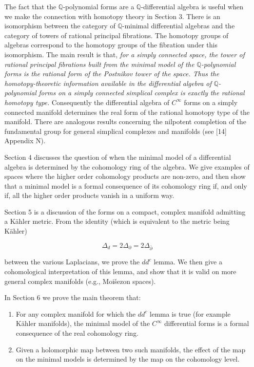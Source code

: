 \documentclass[
  english,
  a3paper,
  a3paper]{extarticle}
\begin{document}
The fact that the \(\mathbb Q\)-polynomial forms are a
\(\mathbb Q\)-differential algebra is useful when we make the connection
with homotopy theory in Section 3. There is an isomorphism between the
category of \(\mathbb Q\)-minimal differential algebras and the category
of towers of rational principal fibrations. The homotopy groups of
algebras correspond to the homotopy groups of the fibration under this
isomorphism. The main result is that, \emph{for a simply connected
space, the tower of rational principal fibrations built from the minimal
model of the \(\mathbb Q\)-polynomial forms is the rational form of the
Postnikov tower of the space. Thus the homotopy-theoretic information
available in the differential algebra of \(\mathbb Q\)-polynomial forms
on a simply connected simplical complex is exactly the rational homotopy
type.} Consequently the differential algebra of \(C^\infty\) forms on a
simply connected manifold determines the real form of the rational
homotopy type of the manifold. There are analogous results concerning
the nilpotent completion of the fundamental group for general simplical
complexes and manifolds (see {[}14{]} Appendix N).

Section 4 discusses the question of when the minimal model of a
differential algebra is determined by the cohomology ring of the
algebra. We give examples of spaces where the higher order cohomology
products are non-zero, and then show that a minimal model is a formal
consequence of its cohomology ring if, and only if, all the higher order
products vanish in a uniform way.

Section 5 is a discussion of the forms on a compact, complex manifold
admitting a Kähler metric. From the identity (which is equivalent to the
metric being Kähler)

\[
\Delta_d=2\Delta_{\partial}=2\Delta_{\bar\partial}
\]

between the various Laplacians, we prove the \(dd^c\) lemma. We then
give a cohomological interpretation of this lemma, and show that it is
valid on more general complex manifolds (e.g., Moišezon spaces).

In Section 6 we prove the main theorem that:

\begin{enumerate}
\def\labelenumi{\arabic{enumi})}
\item
  For any complex manifold for which the \(dd^c\) lemma is true (for
  example Kähler manifolds), the minimal model of the \(C^\infty\)
  differential forms is a formal consequence of the real cohomology
  ring.
\item
  Given a holomorphic map between two such manifolds, the effect of the
  map on the minimal models is determined by the map on the cohomology
  level.
\end{enumerate}
\end{document}
